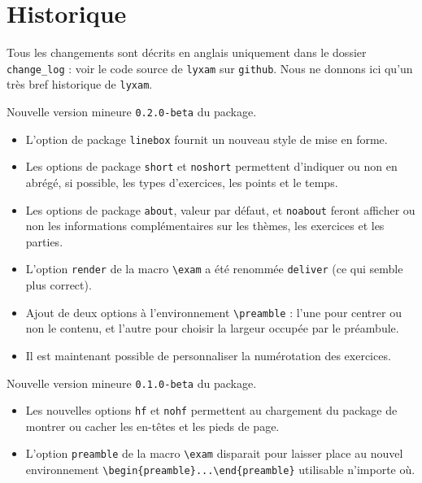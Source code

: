\documentclass[12pt,a4paper]{scrartcl}
\begin{document}
\section{Historique}

Tous les changements sont décrits en anglais uniquement dans le dossier \verb+change_log+ : voir le code source de \verb+lyxam+ sur \verb+github+. Nous ne donnons ici qu'un très bref historique de \verb+lyxam+.

\begin{description}[leftmargin=1em]
    \setlength\itemsep{1em}

    \item[2017-11-28] Nouvelle version mineure \verb+0.2.0-beta+ du package.
    \begin{itemize}
        \item L'option de package \verb+linebox+ fournit un nouveau style de mise en forme.

        \item Les options de package \verb+short+ et \verb+noshort+ permettent d'indiquer ou non en abrégé, si possible, les types d'exercices, les points et le temps.

        \item Les options de package \verb+about+, valeur par défaut, et \verb+noabout+ feront afficher ou non les informations complémentaires sur les thèmes, les exercices et les parties.

        \item L'option \verb+render+ de la macro \verb+\exam+ a été renommée \verb+deliver+ (ce qui semble plus correct).

        \item Ajout de deux options à l'environnement \verb+\preamble+ : l'une pour centrer ou non le contenu, et l'autre pour choisir la largeur occupée par le préambule.

        \item Il est maintenant possible de personnaliser la numérotation des exercices.
    \end{itemize}

    \item[2017-11-12] Nouvelle version mineure \verb+0.1.0-beta+ du package.
    \begin{itemize}
        \item Les nouvelles options \verb+hf+ et \verb+nohf+ permettent au chargement du package de montrer ou cacher les en-têtes et les pieds de page.

        \item L'option \verb+preamble+ de la macro \verb+\exam+ disparait pour laisser place au nouvel environnement \verb+\begin{preamble}...\end{preamble}+ utilisable n'importe où.


\end{itemize}
\end{description}
\end{document}
